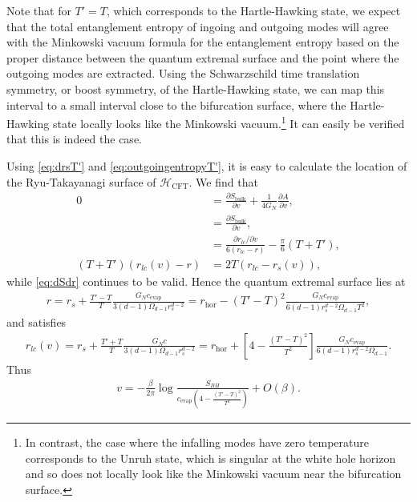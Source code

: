 \documentclass[12pt]{article}
\begin{document}
Note that for $T' = T$, which corresponds to the Hartle-Hawking state, we expect that the total entanglement entropy of ingoing and outgoing modes will agree with the Minkowski vacuum formula for the entanglement entropy based on the proper distance between the quantum extremal surface and the point where the outgoing modes are extracted. Using the Schwarzschild time translation symmetry, or boost symmetry, of the Hartle-Hawking state, we can map this interval to a small interval close to the bifurcation surface, where the Hartle-Hawking state locally looks like the Minkowski vacuum.\footnote{In contrast, the case where the infalling modes have zero temperature corresponds to the Unruh state, which is singular at the white hole horizon and so does not locally look like the Minkowski vacuum near the bifurcation surface.} It can easily be verified that this is indeed the case.

Using \eqref{eq:drsT'} and \eqref{eq:outgoingentropyT'}, it is easy to calculate the location of the Ryu-Takayanagi surface of $\mathcal{H}_\text{CFT}$. We find that
\begin{align}
0 &= \frac{\partial S_\text{bulk}}{\partial v} + \frac{1}{4G_N} \frac{\partial A}{\partial v},
\\& = \frac{\partial S_\text{bulk}}{\partial v},
\\& = \frac{\partial r_{lc}/\partial v}{6(r_{lc} - r)} - \frac{\pi}{6} (T+T'),
\\(T+T') (r_{lc}(v) - r)& = 2 T (r_{lc} - r_s(v)),
\end{align}
while \eqref{eq:dSdr} continues to be valid. Hence the quantum extremal surface lies at
\begin{align} \label{eq:rqT'}
r = r_s + \frac{T' - T}{T} \frac{G_N c_\text{evap}}{3(d-1) \Omega_{d-1} r_s^{d-2}} = r_\text{hor} - (T'-T)^2 \frac{ G_N c_\text{evap}}{6 (d-1) r_s^{d-2} \Omega_{d-1} T^2}, 
\end{align}
and satisfies
\begin{align} \label{eq:rlcT'}
r_{lc}(v) = r_s + \frac{T' + T}{T} \frac{G_N c}{3(d-1) \Omega_{d-1} r_s^{d-2}} = r_\text{hor} +\left[4- \frac{(T'-T)^2}{T^2}\right] \frac{ G_N c_\text{evap}}{6 (d-1) r_s^{d-2} \Omega_{d-1}}.
\end{align}
Thus
\begin{align} \label{eq:vT'}
v = - \frac{\beta}{2 \pi} \log\frac{S_{BH}}{c_\text{evap} (4- \frac{(T'-T)^2}{T^2})} + O(\beta).
\end{align}
\end{document}
